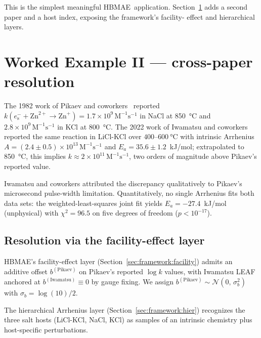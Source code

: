 \documentclass[12pt]{article}
\theoremstyle{plain}
\theoremstyle{definition}
\theoremstyle{remark}
\newcommand{\eS}{\ensuremath{e_{\mathrm{s}}^{-}}\xspace}
\newcommand{\HBMAE}{HBMAE\xspace}
\begin{document}
This is the simplest meaningful \HBMAE\ application.  Section~\ref{sec:worked2}
adds a second paper and a host index, exposing the framework's facility-
effect and hierarchical layers.

\section{Worked Example II --- cross-paper resolution}\label{sec:worked2}

The 1982 work of Pikaev and coworkers~\citep{Pikaev1982} reported
$k(\eS+\mathrm{Zn}^{2+}\to\mathrm{Zn}^+) = 1.7\times 10^{9}\,\mathrm{M}^{-1}
\mathrm{s}^{-1}$ in NaCl at \SI{850}{\celsius} and $2.8\times 10^{9}\,
\mathrm{M}^{-1}\mathrm{s}^{-1}$ in KCl at \SI{800}{\celsius}.  The 2022 work
of Iwamatsu and coworkers~\citep{Iwamatsu2022} reported the same reaction
in LiCl-KCl over $400$--$\SI{600}{\celsius}$ with intrinsic Arrhenius
$A = (2.4\pm 0.5)\times 10^{13}\,\mathrm{M}^{-1}\mathrm{s}^{-1}$ and
$E_a = 35.6\pm 1.2$~kJ/mol; extrapolated to \SI{850}{\celsius}, this implies
$k \approx 2\times 10^{11}\,\mathrm{M}^{-1}\mathrm{s}^{-1}$, two orders of
magnitude above Pikaev's reported value.

Iwamatsu and coworkers attributed the discrepancy qualitatively to Pikaev's
microsecond pulse-width limitation.  Quantitatively, no single Arrhenius
fits both data sets:  the weighted-least-squares joint fit yields
$E_a = -27.4$~kJ/mol (unphysical) with $\chi^2 = 96.5$ on five degrees of
freedom ($p < 10^{-17}$).

\subsection{Resolution via the facility-effect layer}

\HBMAE's facility-effect layer (Section~\ref{sec:framework:facility})
admits an additive offset $b^{(\mathrm{Pikaev})}$ on Pikaev's reported
$\log k$ values, with Iwamatsu LEAF anchored at
$b^{(\mathrm{Iwamatsu})}\equiv 0$ by gauge fixing.  We assign
$b^{(\mathrm{Pikaev})} \sim \mathcal{N}(0,\,\sigma_b^2)$ with
$\sigma_b = \log(10)/2$.

The hierarchical Arrhenius layer (Section~\ref{sec:framework:hier})
recognizes the three salt hosts (LiCl-KCl, NaCl, KCl) as samples of an
intrinsic chemistry plus host-specific perturbations.
\end{document}
